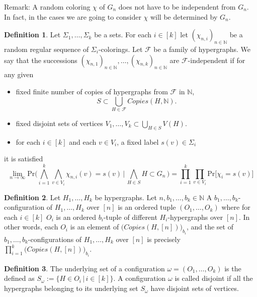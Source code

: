 \documentclass[12pt,notitlepage,a4paper]{article}
\theoremstyle{definition}
\newtheorem{definition}{Definition}[section]
\newcommand{\N}{\mathbb{N}}
\newcommand{\Ln}{\lim\limits_{n\to \infty}}
\begin{document}
Remark: A random coloring $\chi$ of $G_n$ does not have to be independent from
$G_n$. In fact, in the cases we are going to consider $\chi$ will be determined
by $G_n$. 

\begin{definition}
	Let $\Sigma_1,\dots,\Sigma_k$ be a sets. For each $i\in [k]$
	let $(\chi_{n,i})_{n \in \N}$ be a random regular sequence of
	$\Sigma_i$-colorings.
	Let $\mathcal{F}$ be a family of hypergraphs.
	We say that the successions $(\chi_{n,1})_{n \in \N},\dots,
	(\chi_{n,k})_{n \in \N}$ are $\mathcal{F}$-independent if
	for any given
	\begin{itemize}
		\item fixed finite number of copies of hypergraphs from 
		$\mathcal{F}$ in $\N$,
		\[
		S \subset \bigcup_{H\in \mathcal{F}} Copies(H,\N).
		\]		
		\item fixed disjoint sets of vertices 
		$V_1, \dots, V_k \subset \bigcup_{H\in S} V(H).$
		\item for each $i\in [k]$ and each $v\in V_i$, 
		a fixed label $s(v)\in \Sigma_i$
	\end{itemize}
	it is satisfied
	\[
	\Ln \mathrm{Pr}\big(
	\bigwedge_{i=1}^k \bigwedge_{v\in V_i} \chi_{n,i}(v)=s(v)
	\, \big| \, \bigwedge_{H\in S} H\subset G_n \,
	\big) = \prod_{i=1}^k \prod_{v\in V_i} \mathrm{Pr}\big[\chi_i=s(v)
	\big]		
	\]  
\end{definition}

\begin{definition}
	Let $H_1,\dots, H_k$ be hypergraphs. Let $n,b_1,\dots,b_k\in \N$
	A $b_1,\dots,b_k$-configuration of $H_1,\dots, H_k$ over $[n]$
	is an ordered tuple $(O_1,\dots,O_k)$ where for each $i\in [k]$
	$O_i$ is an ordered $b_i$-tuple of different $H_i$-hypergraphs 
	over $[n]$. In other words, each $O_i$ is an element of
	$\big( Copies(H,[n])\big)_{b_i}$, and the set of 
	$b_1,\dots,b_k$-configurations of $H_1,\dots, H_k$ over $[n]$
	is precisely $\prod_{i=1}^{k}\big( Copies(H,[n])\big)_{b_i}$.
\end{definition}

\begin{definition}
 	The underlying set of a configuration $\omega
 	=  (O_1, \dots, O_k)$ is the defined as
 	$S_{\omega}:=\{ H\in O_i \, | \, i\in [k]\}$.
 	A configuration $\omega$ is called disjoint
	if all the hypergraphs belonging to its underlying set
	$S_\omega$ have disjoint sets of vertices. 
\end{definition}
\end{document}
